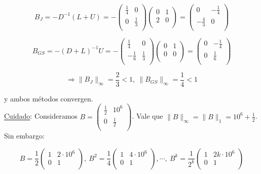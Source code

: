 $$ B_{J} = -D^{-1}(L + U) = -
	\begin{pmatrix}
        \frac{1}{4} & 0\\
        0 & \frac{1}{3}\\
	\end{pmatrix}
    \begin{pmatrix}
        0 & 1\\
        2 & 0\\
    \end{pmatrix}
	=
	\begin{pmatrix}
        0 & -\frac{1}{4}\\
        -\frac{4}{3} & 0\\
	\end{pmatrix}
$$

$$ B_{GS} = -(D + L)^{-1}U = -
	\begin{pmatrix}
        \frac{1}{4} & 0\\
        -\frac{1}{6} & \frac{1}{3}\\
	\end{pmatrix}
    \begin{pmatrix}
        0 & 1\\
        0 & 0\\
    \end{pmatrix}
	=
	\begin{pmatrix}
        0 & -\frac{1}{4}\\
        0 & \frac{1}{6}\\
	\end{pmatrix}
$$

$$\Rightarrow \|B_{J}\|_{\infty} = \frac{2}{3} < 1,\ \|B_{GS}\|_{\infty} = \frac{1}{4} < 1$$

y ambos m\'etodos convergen.\\

\underline{Cuidado}: Consideramos $B =
	\begin{pmatrix}
        \frac{1}{2} & 10^{6}\\
        0 & \frac{1}{2}\\
	\end{pmatrix}
$. Vale que $\|B\|_{\infty} = \|B\|_{1} = 10^{6} + \frac{1}{2}$. Sin embargo:

$$ B = \frac{1}{2}
	\begin{pmatrix}
        1 & 2\cdot10^{6}\\
        0 & 1\\
	\end{pmatrix}
	,\ B^{2} = \frac{1}{4}
    \begin{pmatrix}
        1 & 4\cdot10^{6}\\
        0 & 1\\
	\end{pmatrix}
	, \cdots,\ B^{k} = \frac{1}{2^{k}}
	\begin{pmatrix}
        1 & 2k\cdot10^{6}\\
        0 & 1\\
	\end{pmatrix}
$$

